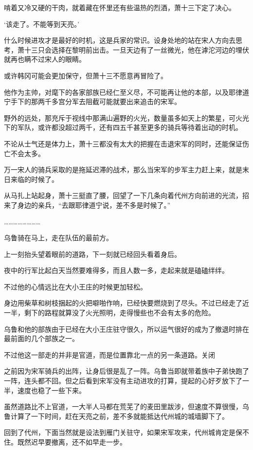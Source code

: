 啃着又冷又硬的干肉，就着藏在怀里还有些温热的烈酒，萧十三下定了决心。

‘该走了。不能等到天亮。’

什么时候进攻才是最好的时机，这是兵家的常识。设身处地的站在宋人方向去思考，萧十三只会选择在黎明前出击。一旦天边有了一丝微光，他在滹沱河边的埋伏就再也瞒不过宋人的眼睛。

或许韩冈可能会更加保守，但萧十三不愿意再冒险了。

他作为主帅，对麾下的各家部族已经仁至义尽，不可能再让他的本部，以及耶律道宁手下的那两千多宫分军去阻截可能就要出来追击的宋军。

野外的远处，那充斥于视线中那满山遍野的火光，数量虽多如天上的繁星，可火光下的军队，或许都没超过两千，还有四五千甚至更多的骑兵等待着出动的时机。

不论从士气还是体力上，萧十三都没有太大的把握在击退宋军的同时，还能保证伤亡不会太多。

万一宋人的骑兵采取的是拖延迟滞的战术，那么当宋军的步军主力赶上来，就是末日来临的时候了。

从马扎上站起身，萧十三挺直了腰，回望了一下几条向着代州方向前进的光流，招来了身边的亲兵，“去跟耶律道宁说，差不多是时候了。”

……………………

乌鲁骑在马上，走在队伍的最前方。

上一刻抬头望着眼前的道路，下一刻就已经回头看着身后。

夜中的行军比起白天当然要难得多，而且人数一多，走起来就是磕磕绊绊。

不过他的心情远比在大小王庄的时候更加轻松。

身边用柴草和树枝捆起的火把噼啪作响，已经快要燃烧到了尽头。不过已经走了近一半，剩下的路程就算没了火光照明，走得慢些也不会有太多的危险。

乌鲁和他的部族由于已经在大小王庄驻守很久，所以运气很好的成为了撤退时排在最前面的几个部族之一。

不过他这一部走的并非是官道，而是位置靠北一点的另一条道路。关闭



之前因为宋军骑兵的出阵，让身后很是乱了一阵。乌鲁当即就带着族中子弟快跑了一阵，连头都不回。但之后看到宋军没有主动进攻的打算，提起的心好歹放下了一半，速度也稳了一些下来。

虽然道路比不上官道，一大半人马都在荒芜了的麦田里跋涉，但速度不算很慢，乌鲁计算了一下时间，赶在天亮之前，差不多就能抵达代州城的城墙脚下了。

回到了代州，下面当然就是设法到雁门关驻守，如果宋军攻来，代州城肯定是保不住。既然迟早要撤离，还不如早走一步。

